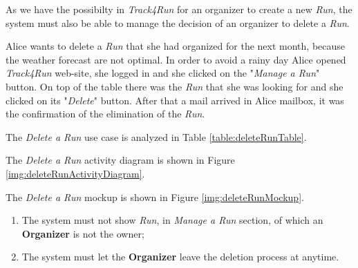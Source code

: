 As we have the possibilty in \textit{Track4Run} for an organizer to create a new \textit{Run}, the system must also be able to manage the decision of an organizer to delete a \textit{Run}.

Alice wants to delete a \textit{Run} that she had organized for the next month, because the weather forecast are not optimal.
In order to avoid a rainy day Alice opened \textit{Track4Run} web-site, she logged in and she clicked on the "\textit{Manage a Run}" button.
On top of the table there was the \textit{Run} that she was looking for and she clicked on its "\textit{Delete}" button.
After that a mail arrived in Alice mailbox, it was the confirmation of the elimination of the \textit{Run}.

The \textit{Delete a Run} use case is analyzed in Table \ref{table:deleteRunTable}.

The \textit{Delete a Run} activity diagram is shown in Figure \ref{img:deleteRunActivityDiagram}.

The \textit{Delete a Run} mockup is shown in Figure \ref{img:deleteRunMockup}.

\begin{enumerate}
  \item The system must not show \textit{Run}, in \textit{Manage a Run} section, of which an \textbf{Organizer} is not the owner;
  \item The system must let the \textbf{Organizer} leave the deletion process at anytime.
\end{enumerate}

